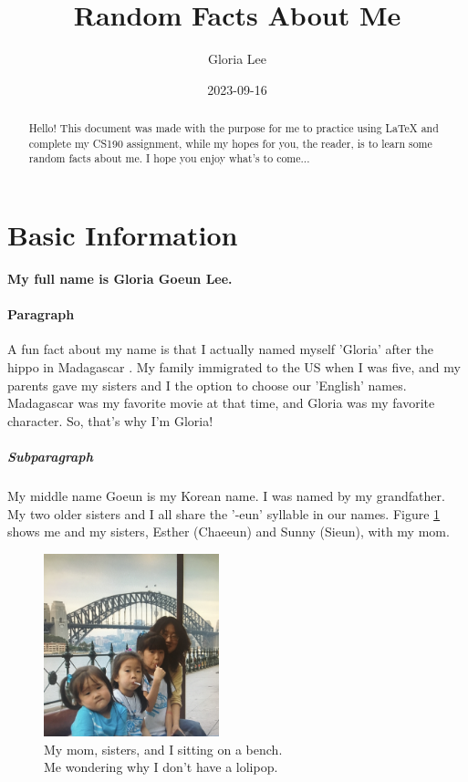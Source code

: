 \documentclass{article}
\title{Random Facts About Me}
\date{2023-09-16}
\author{Gloria Lee}
\begin{document}
  \maketitle
  \newpage

  \begin{abstract}
    \noindent Hello! This document was made with the purpose for me to practice using LaTeX and complete my CS190 assignment, while my hopes for you, the reader, is to learn some random facts about me. 
    I hope you enjoy what's to come... 
  \end{abstract}

  \section{Basic Information}
  \textbf{My full name is Gloria Goeun Lee.}
    \paragraph{Paragraph}
    A fun fact about my name is that I actually named myself 'Gloria' after the hippo in Madagascar \cite{MOVIE:1}. My family immigrated to the US when I was five, and my parents gave my sisters 
    and I the option to choose our 'English' names. Madagascar was my favorite movie at that time, and Gloria was my favorite character. So, that's why I'm Gloria!
    \subparagraph{Subparagraph}
    My middle name Goeun is my Korean name. I was named by my grandfather. My two older sisters and I all share the '-eun' syllable in our names. Figure \ref{fig:sisters} shows me and my sisters, Esther (Chaeeun) and Sunny (Sieun), with my mom.

    \hspace{1cm}
    
    \begin{figure}[hbt!]
      \begin{center}
      \includegraphics[width=2in]{little sisters and me.jpg}
      \captionsetup{justification=centering}
      \caption{My mom, sisters, and I sitting on a bench. \\Me wondering why I don't have a lolipop.}
      \label{fig:sisters}
      \end{center}
    \end{figure}
\end{document}
